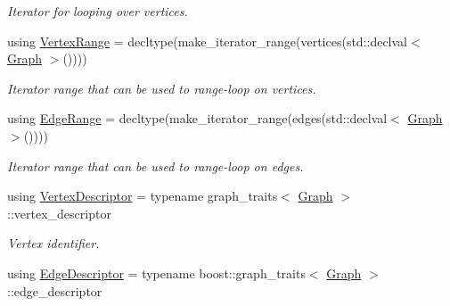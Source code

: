 \begin{DoxyCompactItemize}
\begin{DoxyCompactList}\small\item\em Iterator for looping over vertices. \end{DoxyCompactList}\item 
using \hyperlink{structStateGraph_a5e6fb41e87c50e83293769a58ae714a8}{Vertex\+Range} = decltype(make\+\_\+iterator\+\_\+range(vertices(std\+::declval$<$ \hyperlink{structStateGraph_a150e6f41e378ed1d2d78967244a23a68}{Graph} $>$())))\hypertarget{structStateGraph_a5e6fb41e87c50e83293769a58ae714a8}{}\label{structStateGraph_a5e6fb41e87c50e83293769a58ae714a8}

\begin{DoxyCompactList}\small\item\em Iterator range that can be used to range-\/loop on vertices. \end{DoxyCompactList}\item 
using \hyperlink{structStateGraph_a8ce3f68a1838d6dd8ce4182876e73fbe}{Edge\+Range} = decltype(make\+\_\+iterator\+\_\+range(edges(std\+::declval$<$ \hyperlink{structStateGraph_a150e6f41e378ed1d2d78967244a23a68}{Graph} $>$())))\hypertarget{structStateGraph_a8ce3f68a1838d6dd8ce4182876e73fbe}{}\label{structStateGraph_a8ce3f68a1838d6dd8ce4182876e73fbe}

\begin{DoxyCompactList}\small\item\em Iterator range that can be used to range-\/loop on edges. \end{DoxyCompactList}\item 
using \hyperlink{structStateGraph_a95d7ea26b0d0d07d3488068a8e9be53c}{Vertex\+Descriptor} = typename graph\+\_\+traits$<$ \hyperlink{structStateGraph_a150e6f41e378ed1d2d78967244a23a68}{Graph} $>$\+::vertex\+\_\+descriptor\hypertarget{structStateGraph_a95d7ea26b0d0d07d3488068a8e9be53c}{}\label{structStateGraph_a95d7ea26b0d0d07d3488068a8e9be53c}

\begin{DoxyCompactList}\small\item\em Vertex identifier. \end{DoxyCompactList}\item 
using \hyperlink{structStateGraph_a419a555605bf486301b84dd6055d81f2}{Edge\+Descriptor} = typename boost\+::graph\+\_\+traits$<$ \hyperlink{structStateGraph_a150e6f41e378ed1d2d78967244a23a68}{Graph} $>$\+::edge\+\_\+descriptor\hypertarget{structStateGraph_a419a555605bf486301b84dd6055d81f2}{}\label{structStateGraph_a419a555605bf486301b84dd6055d81f2}


\end{DoxyCompactItemize}
